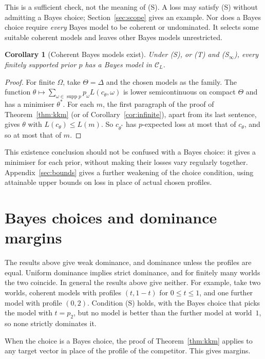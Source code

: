 \documentclass[11pt]{article}
\newtheorem{corollary}[theorem]{Corollary}
\theoremstyle{definition}
\theoremstyle{remark}
\newcommand{\C}{\mathcal C}
\newcommand{\supp}{\operatorname{supp}}
\begin{document}
This is a sufficient check, not the meaning of (S). A loss may satisfy (S) without admitting a Bayes choice; Section~\ref{sec:scope} gives an example. Nor does a Bayes choice require \emph{every} Bayes model to be coherent or undominated. It selects some suitable coherent models and leaves other Bayes models unrestricted.
\begin{corollary}[Coherent Bayes models exist]\label{cor:bayes}
Under (S), or (T) and (S$_\infty$), every finitely supported prior $p$ has a Bayes model in $\C_L$.
\end{corollary}
\begin{proof}
For finite $\Omega$, take $\Theta=\Delta$ and the chosen models as the family. The function $\theta\mapsto\sum_{\omega\in\supp p}p_\omega L(c_\theta,\omega)$ is lower semicontinuous on compact $\Theta$ and has a minimiser $\theta^*$. For each $m$, the first paragraph of the proof of Theorem~\ref{thm:kkm} (or of Corollary~\ref{cor:infinite}), apart from its last sentence, gives $\theta$ with $L(c_\theta)\le L(m)$. So $c_{\theta^*}$ has $p$-expected loss at most that of $c_\theta$, and so at most that of $m$.
\end{proof}

This existence conclusion should not be confused with a Bayes choice: it gives a minimiser for each prior, without making their losses vary regularly together. Appendix~\ref{sec:bounds} gives a further weakening of the choice condition, using attainable upper bounds on loss in place of actual chosen profiles.
\section{Bayes choices and dominance margins}\label{sec:strict}
The results above give weak dominance, and dominance unless the profiles are equal. Uniform dominance implies strict dominance, and for finitely many worlds the two coincide. In general the results above give neither. For example, take two worlds, coherent models with profiles $(t,1-t)$ for $0\le t\le1$, and one further model with profile $(0,2)$. Condition (S) holds, with the Bayes choice that picks the model with $t=p_2$, but no model is better than the further model at world~$1$, so none strictly dominates it.

When the choice is a Bayes choice, the proof of Theorem~\ref{thm:kkm} applies to any target vector in place of the profile of the competitor. This gives margins.
\end{document}
